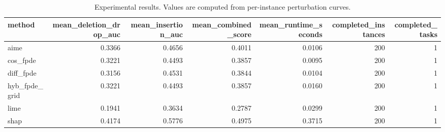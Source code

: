 \begin{table}[t]
\caption{Experimental results. Values are computed from per-instance perturbation curves.}
\label{tab:main_results_computed}
\centering
\begin{tabular}{lrrrrrr}
\toprule
method & mean\_deletion\_drop\_auc & mean\_insertion\_auc & mean\_combined\_score & mean\_runtime\_seconds & completed\_instances & completed\_tasks \\
\midrule
aime & 0.3366 & 0.4656 & 0.4011 & 0.0106 & 200 & 1 \\
cos\_fpde & 0.3221 & 0.4493 & 0.3857 & 0.0095 & 200 & 1 \\
diff\_fpde & 0.3156 & 0.4531 & 0.3844 & 0.0104 & 200 & 1 \\
hyb\_fpde\_grid & 0.3221 & 0.4493 & 0.3857 & 0.0160 & 200 & 1 \\
lime & 0.1941 & 0.3634 & 0.2787 & 0.0299 & 200 & 1 \\
shap & 0.4174 & 0.5776 & 0.4975 & 0.3715 & 200 & 1 \\
\bottomrule
\end{tabular}

\end{table}
